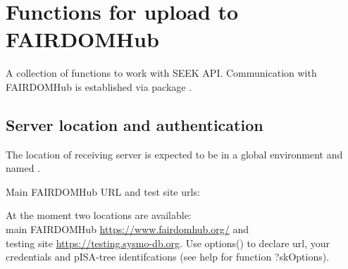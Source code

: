 


\section{Functions for upload to FAIRDOMHub}

A collection of functions to work with SEEK API.
Communication with FAIRDOMHub is established via package .

\subsection{Server location and authentication}


The location of receiving server is expected to be in a global environment and named .

Main FAIRDOMHub URL and test site urls:

At the moment two locations are available:\\
 main FAIRDOMHub \url{https://www.fairdomhub.org/} and\\
  testing site \url{https://testing.sysmo-db.org}.
Use options() to declare url, your credentials and pISA-tree identifcations (see help for function ?skOptions).

